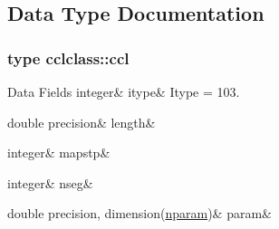 \subsection{Data Type Documentation}
\label{structcclclass_1_1ccl}
\subsubsection{type cclclass\+::ccl}
\begin{DoxyFields}{Data Fields}
\mbox{\label{namespacecclclass_ac0907eebcd93b9aa41c33858f394496d}} 
integer&
itype&
Itype = 103. \\
\hline

\mbox{\label{namespacecclclass_a128d51138685ec33b8c0c7f6bd89dc81}} 
double precision&
length&
\\
\hline

\mbox{\label{namespacecclclass_a5d663b5eeafc5a924cfe6383143f9b0a}} 
integer&
mapstp&
\\
\hline

\mbox{\label{namespacecclclass_a37e0a279ff69258948ddecf0a4c78045}} 
integer&
nseg&
\\
\hline

\mbox{\label{namespacecclclass_a4b800d069f005c436b2295924f8f7bb9}} 
double precision, dimension(\mbox{\hyperlink{namespacecclclass_adeb399ff41e54cda7bdefa51063c0de6}{nparam}})&
param&
\\
\hline

\end{DoxyFields}
